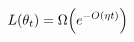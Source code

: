 \documentclass[preview]{standalone}
\begin{document}
\begin{align*}
\special{dvisvgm:raw <g id='unique000'>}L(\theta_t) = \Omega\!\left(e^{-O(\eta t)}\right)\special{dvisvgm:raw </g>}
\end{align*}
\end{document}
